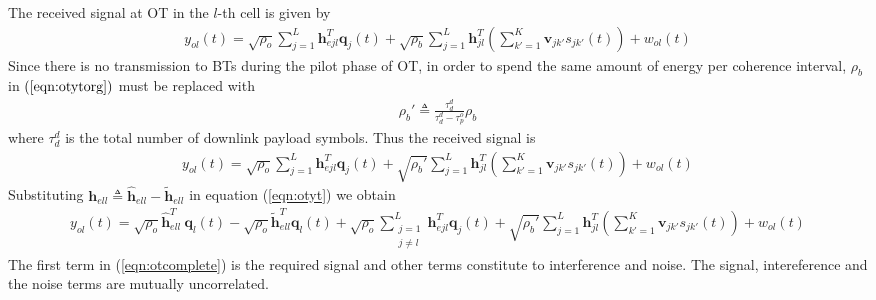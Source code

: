 \documentclass[10pt, a4paper, twoside,fleqn]{article}
\begin{document}
The received signal at OT in the $l$-th cell is given by
\begin{eqnarray}\label{eqn:otytorg}
y_{ol}(t) = \sqrt{\rho_o} \sum_{j=1}^{L} \pmb{h}^T_{ejl} \pmb{q}_j(t)
+ \sqrt{\rho_b} \sum_{j=1}^{L} \pmb{h}^T_{jl} \left(\sum_{k'=1}^{K} \pmb{v}_{jk'} s_{jk'}(t)\right) + w_{ol}(t)  
\end{eqnarray} 
Since there is no transmission to BTs during the pilot phase of OT, in order to spend the same amount of energy per coherence interval, $\rho_b$ in $(\ref{eqn:otytorg})$ must be replaced with
\begin{eqnarray}
\rho_b' \triangleq \frac{\tau_d^d}{\tau_d^d-\tau_p^o}\rho_b
\end{eqnarray}
where $\tau_d^d$ is the total number of downlink payload symbols.
Thus the received signal is
\begin{eqnarray}\label{eqn:otyt}
 y_{ol}(t) = \sqrt{\rho_o} \sum_{j=1}^{L} \pmb{h}^T_{ejl} \pmb{q}_j(t)
            + \sqrt{\rho_b'} \sum_{j=1}^{L} \pmb{h}^T_{jl} \left(\sum_{k'=1}^{K} \pmb{v}_{jk'} s_{jk'}(t)\right) + w_{ol}(t)  
\end{eqnarray} 
Substituting $\pmb{h}_{ell} \triangleq \pmb{\hat h}_{ell}-\pmb{\widetilde{h}}_{ell}$ in equation (\ref{eqn:otyt}) we obtain
\begin{eqnarray}\label{eqn:otcomplete}
  y_{ol}(t)= \sqrt{\rho_o} \pmb{\hat h}^T_{ell} \ \pmb{q}_l(t) 
	    - \sqrt{\rho_o}\pmb{\widetilde{h}}^T_{ell}\pmb{q}_l(t)
	    +\sqrt{\rho_o} \sum_{\substack{j=1 \\ j \neq l}}^{L} \pmb{h}^T_{ejl}\pmb{q}_{j}(t) 
            + \sqrt{\rho_b'} \sum_{j=1}^{L} \pmb{h}^T_{jl} \left(\sum_{k'=1}^{K} \pmb{v}_{jk'} s_{jk'}(t) \right)             
	    + w_{ol}(t)  
\end{eqnarray}
The first term in (\ref{eqn:otcomplete}) is the required signal and other terms constitute to interference and noise. The signal, intereference and the noise terms are mutually uncorrelated. 
\end{document}
